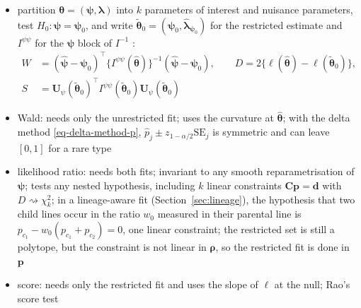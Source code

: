 \begin{itemize}
  \item partition \(\boldsymbol{\theta}=(\boldsymbol{\psi},\boldsymbol{\lambda})\) into \(k\) parameters of interest and nuisance parameters, test
        \(H_{0}:\boldsymbol{\psi}=\boldsymbol{\psi}_{0}\), and write \(\tilde{\boldsymbol{\theta}}_{0}=(\boldsymbol{\psi}_{0},\hat{\boldsymbol{\lambda}}_{\boldsymbol{\psi}_{0}})\) for the restricted
        estimate and \(I^{\psi\psi}\) for the \(\boldsymbol{\psi}\) block of \(I^{-1}\)
        \cite[Sect.~9.3]{coxTheoreticalStatistics1979} \cite[Sect.~4.3]{agrestiFoundationsLinearGeneralized2015}:
        \begin{equation}
          \begin{aligned}
            W&=(\hat{\boldsymbol{\psi}}-\boldsymbol{\psi}_{0})^{\top}\{I^{\psi\psi}(\hat{\boldsymbol{\theta}})\}^{-1}(\hat{\boldsymbol{\psi}}-\boldsymbol{\psi}_{0}),
            \qquad
            D=2\{\ell(\hat{\boldsymbol{\theta}})-\ell(\tilde{\boldsymbol{\theta}}_{0})\},\\
            S&=\boldsymbol{U}_{\psi}(\tilde{\boldsymbol{\theta}}_{0})^{\top}I^{\psi\psi}(\tilde{\boldsymbol{\theta}}_{0})\boldsymbol{U}_{\psi}(\tilde{\boldsymbol{\theta}}_{0})
          \end{aligned}
          \label{eq-three-tests}
        \end{equation}
  \item Wald: needs only the unrestricted fit; uses the curvature at \(\hat{\boldsymbol{\theta}}\); with the delta method
        \eqref{eq-delta-method-p}, \(\hat p_{j}\pm z_{1-\alpha/2}\mathrm{SE}_{j}\) is symmetric and can leave \([0,1]\)
        for a rare type \cite{oehlertNoteDeltaMethod1992}
  \item likelihood ratio: needs both fits; invariant to any smooth reparametrisation of \(\boldsymbol{\psi}\); tests
        any nested hypothesis, including \(k\) linear constraints \(\boldsymbol{C}\boldsymbol{p}=\boldsymbol{d}\) with \(D\rightsquigarrow\chi^{2}_{k}\); in a
        lineage-aware fit (Section~\ref{sec:lineage}), the hypothesis that two child lines occur in the
        ratio \(w_{0}\) measured in their parental line is
        \(p_{c_{1}}-w_{0}(p_{c_{1}}+p_{c_{2}})=0\), one linear constraint; the restricted set is still a polytope,
        but the constraint is not linear in \(\boldsymbol{\rho}\), so the restricted fit is done in \(\boldsymbol{p}\)
  \item score: needs only the restricted fit and uses the slope of \(\ell\) at the null; Rao's score test

\end{itemize}
